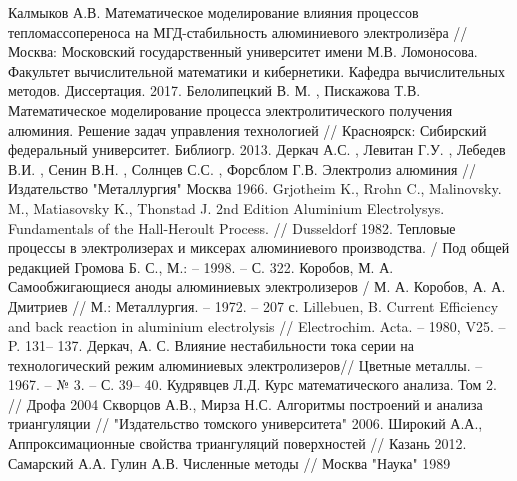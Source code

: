 \documentclass{article}
\begin{document}
\begin{thebibliography}{}
	 Калмыков А.В. Математическое моделирование влияния процессов тепломассопереноса на МГД-стабильность алюминиевого электролизёра // Москва: Московский государственный университет имени М.В. Ломоносова. Факультет вычислительной математики и кибернетики. Кафедра вычислительных методов. Диссертация. 2017.
	  Белолипецкий В. М. , Пискажова Т.В. Математическое моделирование процесса электролитического получения алюминия. Решение задач управления технологией // Красноярск: Сибирский федеральный университет. Библиогр. 2013.
	 Деркач А.С. , Левитан Г.У. , Лебедев В.И. , Сенин В.Н. , Солнцев С.С. , Форсблом Г.В. Электролиз алюминия // Издательство "Металлургия" Москва 1966.
	 Grjotheim K., Rrohn C., Malinovsky. M., Matiasovsky K., Thonstad J. 2nd Edition Aluminium Electrolysys. Fundamentals of the Hall-Heroult Process. // Dusseldorf 1982.
	 Тепловые процессы в электролизерах и миксерах алюминиевого производства. / Под общей редакцией Громова Б. С., М.: – 1998. – С. 322.
	 Коробов, М. А. Самообжигающиеся аноды алюминиевых электролизеров / М. А. Коробов, А. А. Дмитриев // М.: Металлургия. – 1972. – 207 с.
	Lillebuen, B. Current Efficiency and back reaction in aluminium electrolysis // Electrochim. Acta. – 1980, V25. – P. 131– 137. 
	Деркач, А. С. Влияние нестабильности тока серии на технологический режим алюминиевых электролизеров// Цветные металлы. – 1967. – № 3. – С. 39– 40.
	Кудрявцев Л.Д. Курс математического анализа. Том 2. // Дрофа 2004
	  Скворцов А.В., Мирза Н.С. Алгоритмы построений и анализа триангуляции // "Издательство томского университета" 2006.
	 Широкий А.А., Аппроксимационные свойства триангуляций поверхностей // Казань 2012.
	 Самарский А.А. Гулин А.В. Численные методы // Москва "Наука" 1989
\end{thebibliography}
\end{document}
